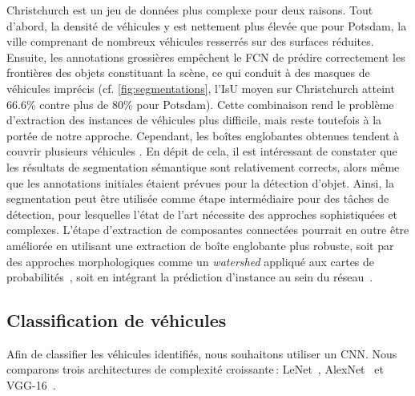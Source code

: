 Christchurch est un jeu de données plus complexe pour deux raisons. Tout d'abord, la densité de véhicules y est nettement plus élevée que pour Potsdam, la ville comprenant de nombreux véhicules resserrés sur des surfaces réduites. Ensuite, les annotations grossières empêchent le \gls{FCN} de prédire correctement les frontières des objets constituant la scène, ce qui conduit à des masques de véhicules imprécis (cf. \cref{fig:segmentations}, l'\gls{IsU} moyen sur Christchurch atteint 66.6\% contre plus de 80\% pour Potsdam). Cette combinaison rend le problème d'extraction des instances de véhicules plus difficile, mais reste toutefois à la portée de notre approche. Cependant, les boîtes englobantes obtenues tendent à couvrir plusieurs véhicules .
En dépit de cela, il est intéressant de constater que les résultats de segmentation sémantique sont relativement corrects, alors même que les annotations initiales étaient prévues pour la détection d'objet. Ainsi, la segmentation peut être utilisée comme étape intermédiaire pour des tâches de détection, pour lesquelles l'état de l'art nécessite des approches sophistiquées et complexes. L'étape d'extraction de composantes connectées pourrait en outre être améliorée en utilisant une extraction de boîte englobante plus robuste, soit par des approches morphologiques comme un \emph{watershed} appliqué aux cartes de probabilités~\cite{beucher_morphological_1993}, soit en intégrant la prédiction d'instance au sein du réseau~\cite{dai_instance-aware_2015,he_mask_2017}.

\subsection{Classification de véhicules}

Afin de classifier les véhicules identifiés, nous souhaitons utiliser un \gls{CNN}. Nous comparons trois architectures de complexité croissante\,: LeNet~\cite{lecun_gradient-based_1998}, AlexNet~\cite{krizhevsky_imagenet_2012} et VGG-16~\cite{simonyan_very_2014}.


